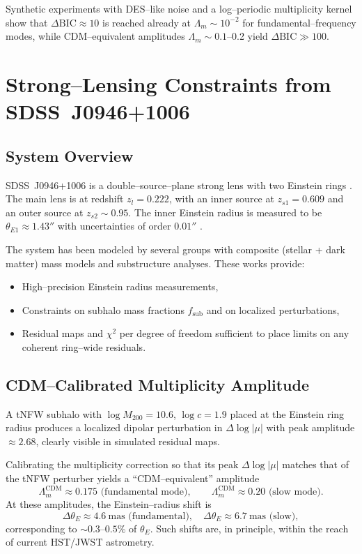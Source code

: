 \documentclass[11pt]{article}
\begin{document}
Synthetic experiments with DES--like noise and a log--periodic multiplicity kernel show that $\Delta\mathrm{BIC} \approx 10$ is reached already at $\Lambda_m \sim 10^{-2}$ for fundamental--frequency modes, while CDM--equivalent amplitudes $\Lambda_m \sim 0.1$--0.2 yield $\Delta\mathrm{BIC} \gg 100$.

\section{Strong--Lensing Constraints from SDSS~J0946+1006}

\subsection{System Overview}

SDSS~J0946+1006 is a double--source--plane strong lens with two Einstein rings \cite{Gavazzi2008,Collett2014}. The main lens is at redshift $z_l = 0.222$, with an inner source at $z_{s1} = 0.609$ and an outer source at $z_{s2} \sim 0.95$. The inner Einstein radius is measured to be $\theta_{E1} \approx 1.43''$ with uncertainties of order $0.01''$ \cite{Collett2014}.

The system has been modeled by several groups with composite (stellar + dark matter) mass models and substructure analyses. These works provide:

\begin{itemize}[leftmargin=*]
  \item High--precision Einstein radius measurements,
  \item Constraints on subhalo mass fractions $f_{\text{sub}}$ and on localized perturbations,
  \item Residual maps and $\chi^2$ per degree of freedom sufficient to place limits on any coherent ring--wide residuals.
\end{itemize}

\subsection{CDM--Calibrated Multiplicity Amplitude}

A tNFW subhalo with $\log M_{200}=10.6$, $\log c=1.9$ placed at the Einstein ring radius produces a localized dipolar perturbation in $\Delta\log|\mu|$ with peak amplitude $\approx 2.68$, clearly visible in simulated residual maps.

Calibrating the multiplicity correction so that its peak $\Delta\log|\mu|$ matches that of the tNFW perturber yields a ``CDM--equivalent'' amplitude
\begin{equation}
  \Lambda_m^{\text{CDM}} \approx 0.175 \text{ (fundamental mode)},\qquad
  \Lambda_m^{\text{CDM}} \approx 0.20 \text{ (slow mode)}.
\end{equation}
At these amplitudes, the Einstein--radius shift is
\begin{equation}
  \Delta\theta_E \approx 4.6~\text{mas (fundamental)},\quad
  \Delta\theta_E \approx 6.7~\text{mas (slow)},
\end{equation}
corresponding to $\sim 0.3$--$0.5\%$ of $\theta_E$. Such shifts are, in principle, within the reach of current HST/JWST astrometry.
\end{document}
